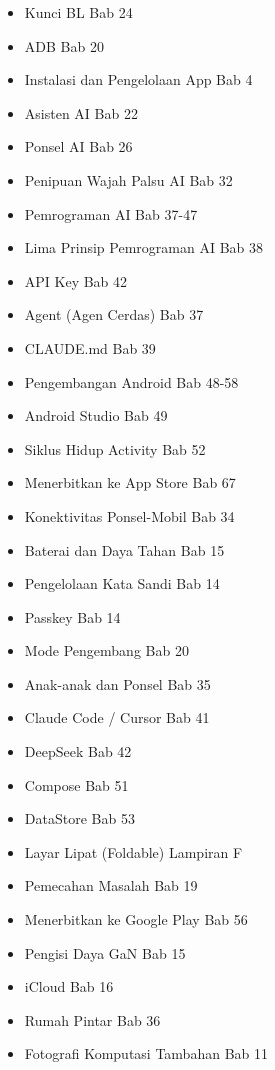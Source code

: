 


\begin{itemize}
  \item Kunci BL Bab 24
  \item ADB Bab 20
  \item Instalasi dan Pengelolaan App Bab 4
  \item Asisten AI Bab 22
  \item Ponsel AI Bab 26
  \item Penipuan Wajah Palsu AI Bab 32
  \item Pemrograman AI Bab 37-47
  \item Lima Prinsip Pemrograman AI Bab 38
  \item API Key Bab 42
  \item Agent (Agen Cerdas) Bab 37
  \item CLAUDE.md Bab 39
  \item Pengembangan Android Bab 48-58
  \item Android Studio Bab 49
  \item Siklus Hidup Activity Bab 52
  \item Menerbitkan ke App Store Bab 67
\end{itemize}


\begin{itemize}
  \item Konektivitas Ponsel-Mobil Bab 34
  \item Baterai dan Daya Tahan Bab 15
  \item Pengelolaan Kata Sandi Bab 14
  \item Passkey Bab 14
  \item Mode Pengembang Bab 20
  \item Anak-anak dan Ponsel Bab 35
  \item Claude Code / Cursor Bab 41
  \item DeepSeek Bab 42
  \item Compose Bab 51
  \item DataStore Bab 53
\end{itemize}


\begin{itemize}
  \item Layar Lipat (Foldable) Lampiran F
  \item Pemecahan Masalah Bab 19
  \item Menerbitkan ke Google Play Bab 56
  \item Pengisi Daya GaN Bab 15
  \item iCloud Bab 16
  \item Rumah Pintar Bab 36
  \item Fotografi Komputasi Tambahan Bab 11
\end{itemize}

